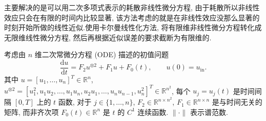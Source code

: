 \begin{method}
	\cite{43}主要解决的是可以用二次多项式表示的耗散非线性微分方程, 由于耗散所以非线性效应只会在有限的时间内比较显著, 该方法考虑的就是在非线性效应没那么显著的时刻开始所做的线性近似.使用卡尔曼线性化方法, 将有限维非线性微分方程转化成无限维线性微分方程, 然后再根据近似误差的要求截断为有限维的.
	
	考虑由 $n$ 维二次常微分方程 (ODE) 描述的初值问题
	\begin{equation}
		\frac{\mathrm{d}u}{\mathrm{d}t} = F_2 u^{\otimes 2} + F_1 u + F_0(t), \qquad
		u(0) = u_{\mathrm{in}}.
		\label{eq:NODE}
	\end{equation}
	其中 $u=[u_1, \ldots, u_n]^{T}\in\mathbb{R}^n$, $u^{\otimes 2}=[u_1^2, u_1u_2, \ldots, u_1u_n, u_2u_1, \ldots, u_nu_{n-1}, u_n^2]^{T}\in\mathbb{R}^{n^2}$, 每个 $u_j = u_j(t)$ 是时间间隔 $[0,T]$ 上的 $t$ 函数, 对于 $j\in\{1,\ldots,n\}$, $F_2\in\mathbb{R}^{n\times n^2}$, $F_1\in\mathbb{R}^{n\times n}$ 是与时间无关的矩阵, 而非齐次项 $F_0(t)\in\mathbb{R}^n$ 是 $t$ 的 $C^1$ 连续函数. $\|\cdot\|$ 表示谱范数.
	

\end{method}
